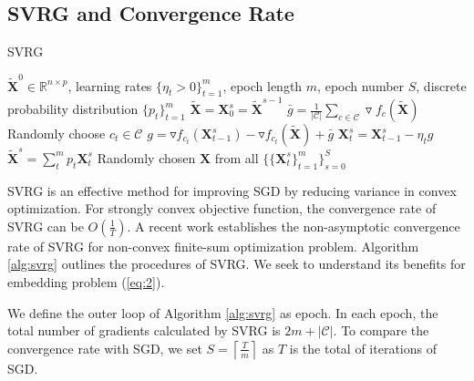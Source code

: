 \documentclass[letterpaper]{article}
\begin{document}
		\subsection{SVRG and Convergence Rate}

		\begin{algorithm}
			\caption{SVRG}\label{alg:svrg}
			\begin{algorithmic}[1]
				\Require $\tilde{\mathbf{X}}^0\in\mathbb{R}^{n\times p}$, learning rates $\{\eta_t>0\}^{m}_{t=1}$, epoch length $m$, epoch number $S$, discrete probability distribution $\{p_t\}^m_{t=1}$
					\State $\tilde{\mathbf{X}} = \mathbf{X}^s_0 =\tilde{\mathbf{X}}^{s-1}$
					\State $\bar{g} = \frac{1}{|\mathcal{C}|}\underset{c\in\mathcal{C}}{\sum}\triangledown f_c(\tilde{\mathbf{X}})$
						\State Randomly choose $c_t\in\mathcal{C}$
						\State $g=\triangledown f_{c_t}(\mathbf{X}^s_{t-1})-\triangledown f_{c_t}(\tilde{\mathbf{X}})+\bar{g}$
						\State $\mathbf{X}^s_{t}= \mathbf{X}^s_{t-1}-\eta_t g$
					\EndFor
					\State $\tilde{\mathbf{X}}^{s}=\sum^{m}_{t}p_{t}\mathbf{X}^s_{t}$
				\EndFor
				\Ensure Randomly chosen $\mathbf{X}$ from all $\{\{\mathbf{X}^s_t\}^m_{t=1}\}^S_{s=0}$
			\end{algorithmic}
		\end{algorithm}

		SVRG \cite{rie2013accelerating} is an effective method for improving SGD by reducing variance in convex optimization. For strongly convex objective function, the convergence rate of SVRG can be $O(\frac{1}{T})$. A recent work \cite{reddic2016nonconvex} establishes the non-asymptotic convergence rate of SVRG for non-convex finite-sum optimization problem. Algorithm \ref{alg:svrg} outlines the procedures of SVRG. We seek to understand its benefits for embedding problem (\ref{eq:2}).

		We define the outer loop of Algorithm \ref{alg:svrg} as epoch. In each epoch, the total number of gradients calculated by SVRG is $2m+|\mathcal{C}|$. To compare the convergence rate with SGD, we set $S = \left \lceil \frac{T}{m} \right \rceil$ as $T$ is the total of iterations of SGD.
\end{document}
